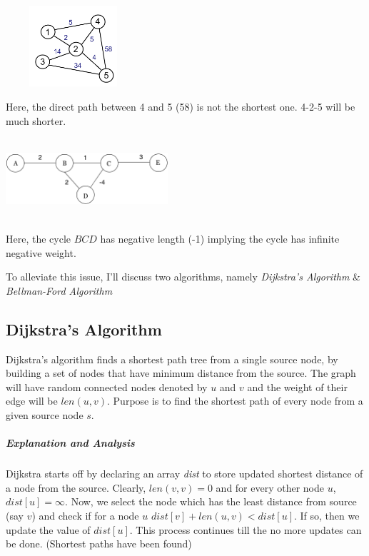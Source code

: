 \documentclass[11pt,a4paper]{extarticle}
\begin{document}
\begin{multicols}{2}

\begin{center}
	\includegraphics[width=5cm, height=3cm]{shortest}
\end{center}
Here, the direct path between 4 and 5 (58) is not the shortest one. 4-2-5 will be much shorter.

\columnbreak

\begin{center}
	\includegraphics[width=6cm, height=3cm]{negative}
\end{center}

Here, the cycle $BCD$ has negative length (-1) implying the cycle has infinite negative weight.

\end{multicols}

To alleviate this issue, I'll discuss two algorithms, namely \textit{Dijkstra's Algorithm} \& \textit{Bellman-Ford Algorithm}

\subsection{Dijkstra's Algorithm}
Dijkstra’s algorithm finds a shortest path tree from a single source node, by building a set of nodes that have minimum distance from the source. The graph will have random connected nodes denoted by $u$ and $v$ and the weight of their edge will be $len(u,v)$. Purpose is to find the shortest path of every node from a given source node $s$.

\begin{adjustwidth}{2.5em}{0pt}

\end{adjustwidth}

\subparagraph{Explanation and Analysis}
Dijkstra starts off by declaring an array \textit{dist} to store updated shortest distance of a node from the source. Clearly, $len(v,v) = 0$ and for every other node $u$, $dist[u] = \infty$. Now, we select the node which has the least distance from source (say $v$) and check if for a node $u$ $dist[v] + len(u,v) < dist[u]$. If so, then we update the value of $dist[u]$. This process continues till the no more updates can be done. (Shortest paths have been found)
\end{document}
